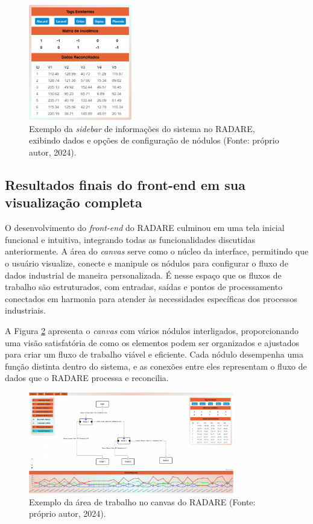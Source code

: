 \begin{figure}[htbp]
    \centering
    \includegraphics[width=0.4\textwidth]{figuras/interface-sidebar.png}
    \caption{Exemplo da \textit{sidebar} de informações do sistema no RADARE, exibindo dados e opções de configuração de nódulos (Fonte: próprio autor, 2024).}
    \label{Fig:SidebarInterface}
\end{figure}

\subsection{Resultados finais do front-end em sua visualização completa}

O desenvolvimento do \textit{front-end} do RADARE culminou em uma tela inicial funcional e intuitiva, integrando todas as funcionalidades discutidas anteriormente. A área do \textit{canvas} serve como o núcleo da interface, permitindo que o usuário visualize, conecte e manipule os nódulos para configurar o fluxo de dados industrial de maneira personalizada. É nesse espaço que os fluxos de trabalho são estruturados, com entradas, saídas e pontos de processamento conectados em harmonia para atender às necessidades específicas dos processos industriais.

A Figura \ref{Fig:CanvasArea} apresenta o \textit{canvas} com vários nódulos interligados, proporcionando uma visão satisfatória de como os elementos podem ser organizados e ajustados para criar um fluxo de trabalho viável e eficiente. Cada nódulo desempenha uma função distinta dentro do sistema, e as conexões entre eles representam o fluxo de dados que o RADARE processa e reconcilia. 

\begin{figure}[htbp]
    \centering
    \includegraphics[width=0.8\textwidth]{figuras/interface-completa.png}
    \caption{Exemplo da área de trabalho no canvas do RADARE (Fonte: próprio autor, 2024).}
    \label{Fig:CanvasArea}
\end{figure}

